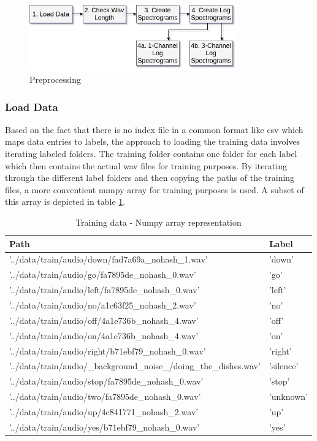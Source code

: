 \documentclass{article}
\theoremstyle{definition}
\theoremstyle{remark}
\begin{document}
\begin{figure}[h]
    \centering
    \includegraphics[width=0.8\textwidth]{img/preprocessing.png}
    \caption{Preprocessing}
    \label{fig:preprocessing}
\end{figure}


\subsubsection{Load Data}

Based on the fact that there is no index file in a common format like csv which maps data entries to labels, the approach to loading the training data involves iterating labeled folders. The training folder contains one folder for each label which then contains the actual wav files for training purposes. By iterating through the different label folders and then copying the paths of the training files, a more conventient numpy array for training purposes is used. A subset of this array is depicted in table \ref{tab:numpy_array_representation}.


\begin{table}[h!]
\center
\begin{tabular}{|l|l|}
\hline
Path & Label \\ \hline
'../data/train/audio/down/fad7a69a\_nohash\_1.wav' & 'down'  \\ \hline
'../data/train/audio/go/fa7895de\_nohash\_0.wav' & 'go'  \\ \hline
'../data/train/audio/left/fa7895de\_nohash\_0.wav'  & 'left'  \\ \hline
'../data/train/audio/no/a1c63f25\_nohash\_2.wav'   & 'no'  \\ \hline
'../data/train/audio/off/4a1e736b\_nohash\_4.wav'  & 'off'  \\ \hline
'../data/train/audio/on/4a1e736b\_nohash\_4.wav'  & 'on'  \\ \hline
'../data/train/audio/right/b71ebf79\_nohash\_0.wav'      & 'right'  \\ \hline
'../data/train/audio/\_background\_noise\_/doing\_the\_dishes.wav'  & 'silence'   \\ \hline
'../data/train/audio/stop/fa7895de\_nohash\_0.wav' & 'stop'  \\ \hline
'../data/train/audio/two/fa7895de\_nohash\_0.wav'& 'unknown'  \\ \hline
'../data/train/audio/up/4c841771\_nohash\_2.wav' & 'up'  \\ \hline
'../data/train/audio/yes/b71ebf79\_nohash\_0.wav' & 'yes'  \\ \hline
\end{tabular}
\caption{Training data - Numpy array representation}
\label{tab:numpy_array_representation}
\end{table}
\end{document}

